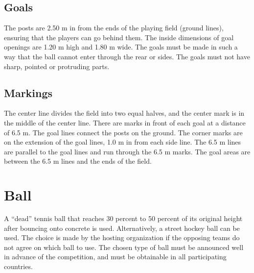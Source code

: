 \subsection{Goals}
The posts are 2.50 m in from the ends of the playing field (ground lines), ensuring that the players can go behind them.
The inside dimensions of goal openings are 1.20 m high and 1.80 m wide.
The goals must be made in such a way that the ball cannot enter through the rear or sides. The goals must not have sharp, pointed or protruding parts.

\subsection{Markings}
The center line divides the field into two equal halves, and the center mark is in the middle of the center line.
There are marks in front of each goal at a distance of 6.5 m.
The goal lines connect the posts on the ground.
The corner marks are on the extension of the goal lines, 1.0 m in from each side line.
The 6.5 m lines are parallel to the goal lines and run through the 6.5 m marks.
The goal areas are between the 6.5 m lines and the ends of the field.

\section{Ball}
A ``dead'' tennis ball that reaches 30 percent to 50 percent of its original height after bouncing onto concrete is used.
Alternatively, a street hockey ball can be used.
The choice is made by the hosting organization if the opposing teams do not agree on which ball to use.
The chosen type of ball must be announced well in advance of the competition, and must be obtainable in all participating countries.

